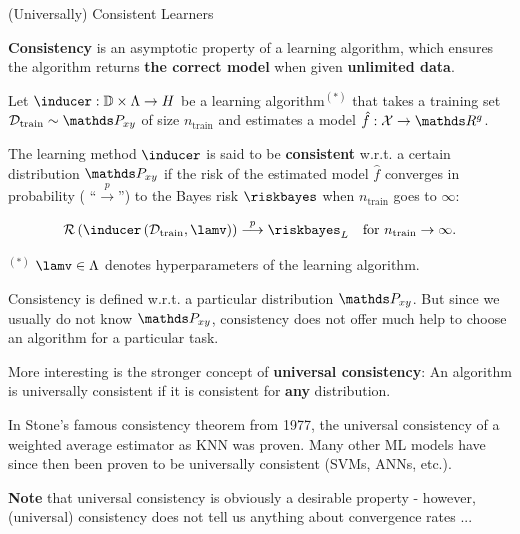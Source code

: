 \begin{vbframe}{(Universally) Consistent Learners}

\textbf{Consistency} is an asymptotic property of a learning algorithm, which ensures the algorithm returns \textbf{the correct model} when given \textbf{unlimited data}.

\lz 

Let $\inducer:\mathbb{D}\times \Lambda \to \Hspace$ be a learning algorithm$^{(*)}$ that takes a training set $\Dtrain \sim \Pxy$ of size $n_\text{train}$ and estimates a model $\hat f: \Xspace \to \R^g$. 

\lz 

The learning method $\inducer$ is said to be \textbf{consistent} w.r.t. a certain distribution $\Pxy$ if the risk of the estimated model $\hat f$ converges in probability ( \enquote{$\overset{p}{\longrightarrow}$}) to the Bayes risk $\riskbayes$ when $n_\text{train}$ goes to $\infty$: 

$$
	\risk\left(\inducer\left(\Dtrain, \lamv\right)\right) \overset{p}{\longrightarrow} \riskbayes_L \quad \text{for } n_\text{train} \to \infty.
$$

\vfill


\begin{footnotesize}$^{(*)}$ $\lamv \in \Lambda$ denotes hyperparameters of the learning algorithm.\end{footnotesize} 

\framebreak 

Consistency is defined w.r.t. a particular distribution $\Pxy$.
But since we usually do not know $\Pxy$, consistency
does not offer much help to choose an algorithm for a particular task. 

\lz 

More interesting is the stronger concept of \textbf{universal consistency}: An algorithm is universally consistent if it is consistent for \textbf{any} distribution. 

\lz 

In Stone's famous consistency theorem from 1977, the universal consistency of a weighted average estimator as KNN was proven. Many other ML models have since then been proven to be universally consistent (SVMs, ANNs, etc.).

\lz

\textbf{Note} that universal consistency is obviously a desirable property - however, (universal) consistency does not tell us anything about convergence rates ...

\end{vbframe}


